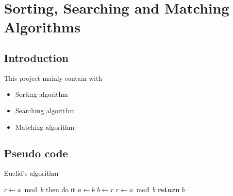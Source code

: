 \documentclass[cs4size, punct, nospace, fancyhdr, fntef]{ctexart}
\begin{document}
  \section{Sorting, Searching and Matching Algorithms}

  \subsection{Introduction}
    This project mainly contain with 
    \begin{itemize}
      \item Sorting algorithm
      \item Searching algorithm
      \item Matching algorithm
    \end{itemize}
  \subsection{Pseudo code}
    \begin{algorithm}
    \caption{Euclid's algorithm}\label{euclid}
    \begin{algorithmic}[1]
      \State $r\gets a\bmod b$
        \State then do it
      \EndIf
        \State $a\gets b$
        \State $b\gets r$
        \State $r\gets a\bmod b$
      \EndWhile\label{euclidendwhile}
      \State \textbf{return} $b$
    \EndFunction
    \end{algorithmic}
    \end{algorithm}
\end{document}
